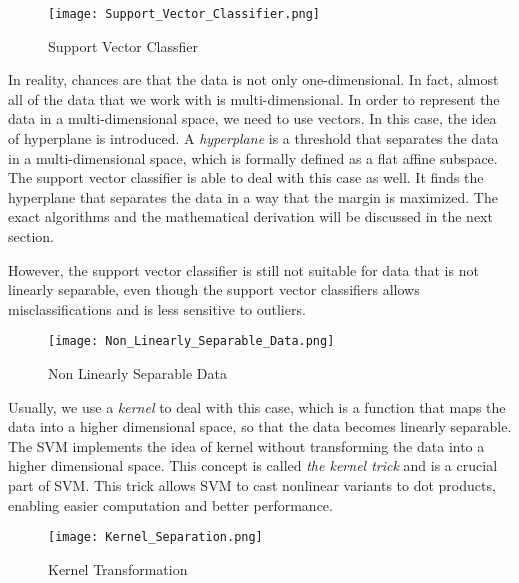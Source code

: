 \begin{figure}[h]%
    \begin{center}%
        \texttt{[image: Support\_Vector\_Classifier.png]}%
        \caption{Support Vector Classfier}\label{fig:}%
    \end{center}%
\end{figure}

In reality, chances are that the data is not only one-dimensional. In fact, almost all of the data that we work with
is multi-dimensional. In order to represent the data in a multi-dimensional space, we need to use vectors. In this case,
the idea of hyperplane is introduced. A \emph{hyperplane} is a threshold that separates the data in a multi-dimensional space,
which is formally defined as a flat affine subspace.\cite{R9} The support vector classifier is able to deal with this case as well.
It finds the hyperplane that separates the data in a way that the margin is maximized. The exact algorithms and the
mathematical derivation will be discussed in the next section.

However, the support vector classifier is still not suitable for data that is not linearly separable, even though 
the support vector classifiers allows misclassifications and is less sensitive to outliers.
\begin{figure}[h]%
    \begin{center}%
        \texttt{[image: Non\_Linearly\_Separable\_Data.png]}%
        \caption{Non Linearly Separable Data}\label{fig:}%
    \end{center}%
\end{figure}

Usually, we use a \emph{kernel} to deal 
with this case, which is a function that maps the data into a higher dimensional space, so that the data becomes linearly
separable. The SVM implements the idea of kernel without transforming the data into a higher dimensional space. This concept is 
called \emph{the kernel trick} and is a crucial part of SVM. This trick allows SVM to cast nonlinear variants to dot products,
enabling easier computation and better performance. \cite{Kernel2}
\begin{figure}[h]%
    \begin{center}%
        \texttt{[image: Kernel\_Separation.png]}%
        \caption{Kernel Transformation}\label{fig:}%
    \end{center}%
\end{figure}
